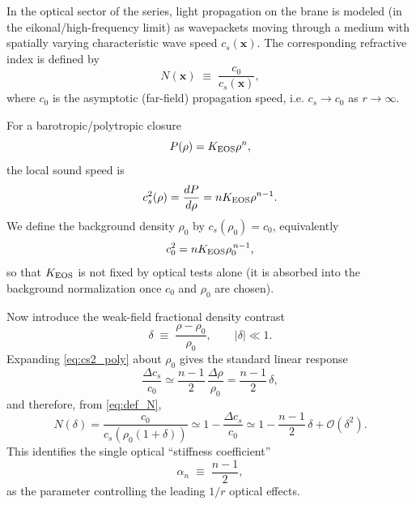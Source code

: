 \documentclass[11pt]{article}
\begin{document}
In the optical sector of the series, light propagation on the brane is modeled (in the eikonal/high-frequency limit) as wavepackets moving through a medium with spatially varying characteristic wave speed $c_s(\mathbf{x})$. The corresponding refractive index is defined by
\begin{equation}
N(\mathbf{x}) \;\equiv\; \frac{c_0}{c_s(\mathbf{x})},
\label{eq:def_N}
\end{equation}
where $c_0$ is the asymptotic (far-field) propagation speed, i.e. $c_s\to c_0$ as $r\to\infty$. 

For a barotropic/polytropic closure
\begin{equation}
P(\rho)=K_{\rm EOS}\rho^n,
\label{eq:poly_eos}
\end{equation}
the local sound speed is
\begin{equation}
c_s^2(\rho)=\frac{dP}{d\rho}=nK_{\rm EOS}\rho^{n-1}.
\label{eq:cs2_poly}
\end{equation}
We define the background density $\rho_0$ by $c_s(\rho_0)=c_0$, equivalently
\begin{equation}
c_0^2 = nK_{\rm EOS}\rho_0^{\,n-1},
\label{eq:c0_def}
\end{equation}
so that $K_{\rm EOS}$ is not fixed by optical tests alone (it is absorbed into the background normalization once $c_0$ and $\rho_0$ are chosen). 

Now introduce the weak-field fractional density contrast
\begin{equation}
\delta \;\equiv\; \frac{\rho-\rho_0}{\rho_0},\qquad |\delta|\ll 1.
\end{equation}
Expanding \eqref{eq:cs2_poly} about $\rho_0$ gives the standard linear response
\begin{equation}
\frac{\Delta c_s}{c_0}
\simeq
\frac{n-1}{2}\,\frac{\Delta\rho}{\rho_0}
=
\frac{n-1}{2}\,\delta,
\label{eq:dcs_linear}
\end{equation}
and therefore, from \eqref{eq:def_N},
\begin{equation}
N(\delta)
=
\frac{c_0}{c_s(\rho_0(1+\delta))}
\simeq
1-\frac{\Delta c_s}{c_0}
\simeq
1-\frac{n-1}{2}\,\delta
+\mathcal{O}(\delta^2).
\label{eq:N_delta_general}
\end{equation}
This identifies the single optical ``stiffness coefficient''
\begin{equation}
\alpha_n \;\equiv\; \frac{n-1}{2},
\label{eq:alpha_n_def}
\end{equation}
as the parameter controlling the leading $1/r$ optical effects. 
\end{document}

